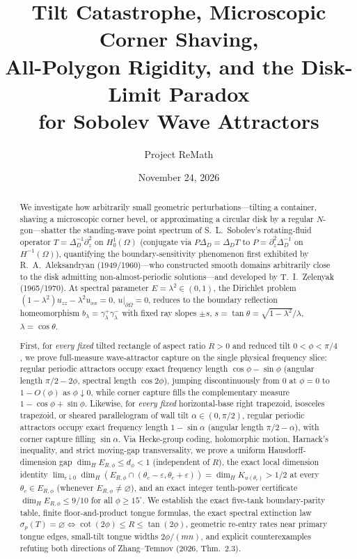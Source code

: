 \documentclass[11pt,reqno]{amsart}
\title[Tilt Catastrophe, Corner Shaving, Rigidity, and Disk-Limit Paradox]{Tilt Catastrophe, Microscopic Corner Shaving,\\
All-Polygon Rigidity, and the Disk-Limit Paradox\\
for Sobolev Wave Attractors}
\author{Project ReMath}
\date{November 24, 2026}
\theoremstyle{definition}
\theoremstyle{remark}
\begin{document}
\begin{abstract}
We investigate how arbitrarily small geometric perturbations---tilting a container, shaving a microscopic corner bevel, or approximating a circular disk by a regular $N$-gon---shatter the standing-wave point spectrum of S.~L.~Sobolev's rotating-fluid operator $T = \Delta_D^{-1}\partial_z^2$ on $H_0^1(\Omega)$ (conjugate via $P\Delta_D = \Delta_D T$ to $P = \partial_z^2\Delta_D^{-1}$ on $H^{-1}(\Omega)$), quantifying the boundary-sensitivity phenomenon first exhibited by R.~A.~Aleksandryan (1949/1960)---who constructed smooth domains arbitrarily close to the disk admitting non-almost-periodic solutions---and developed by T.~I.~Zelenyak (1965/1970). At spectral parameter $E = \lambda^2 \in (0,1)$, the Dirichlet problem $(1-\lambda^2)u_{zz} - \lambda^2 u_{xx} = 0$, $u|_{\partial\Omega} = 0$, reduces to the boundary reflection homeomorphism $b_\lambda = \gamma_\lambda^+\gamma_\lambda^-$ with fixed ray slopes $\pm s$, $s = \tan\theta = \sqrt{1-\lambda^2}/\lambda$, $\lambda = \cos\theta$.

First, for \emph{every fixed} tilted rectangle of aspect ratio $R > 0$ and reduced tilt $0 < \phi < \pi/4$, we prove full-measure wave-attractor capture on the single physical frequency slice: regular periodic attractors occupy exact frequency length $\cos\phi - \sin\phi$ (angular length $\pi/2 - 2\phi$, spectral length $\cos 2\phi$), jumping discontinuously from $0$ at $\phi = 0$ to $1 - O(\phi)$ as $\phi \downarrow 0$, while corner capture fills the complementary measure $1 - \cos\phi + \sin\phi$. Likewise, for \emph{every fixed} horizontal-base right trapezoid, isosceles trapezoid, or sheared parallelogram of wall tilt $\alpha \in (0, \pi/2)$, regular periodic attractors occupy exact frequency length $1 - \sin\alpha$ (angular length $\pi/2 - \alpha$), with corner capture filling $\sin\alpha$. Via Hecke-group coding, holomorphic motion, Harnack's inequality, and strict moving-gap transversality, we prove a uniform Hausdorff-dimension gap $\dim_H E_{R,\phi} \le d_\phi < 1$ (independent of $R$), the exact local dimension identity $\lim_{\varepsilon\downarrow 0}\dim_H(E_{R,\phi} \cap (\theta_c-\varepsilon,\theta_c+\varepsilon)) = \dim_H K_{u(\theta_c)} > 1/2$ at every $\theta_c \in E_{R,\phi}$ (whenever $E_{R,\phi} \ne \varnothing$), and an exact integer tenth-power certificate $\dim_H E_{R,\phi} \le 9/10$ for all $\phi \ge 15^\circ$. We establish the exact five-tank boundary-parity table, finite floor-and-product tongue formulas, the exact spectral extinction law $\sigma_p(T) = \varnothing \iff \cot(2\phi) \le R \le \tan(2\phi)$, geometric re-entry rates near primary tongue edges, small-tilt tongue widths $2\phi/(mn)$, and explicit counterexamples refuting both directions of Zhang--Temnov (2026, Thm.~2.3).


\end{abstract}
\end{document}
